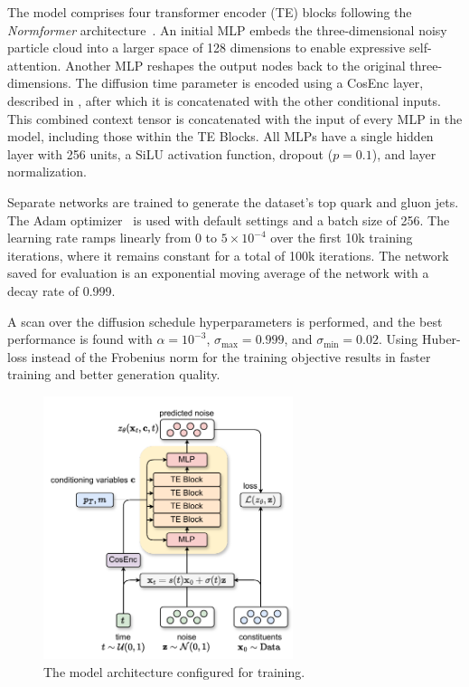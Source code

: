 The model comprises four transformer encoder (TE) blocks following the \textit{Normformer} architecture~\cite{Normformer}.
An initial MLP embeds the three-dimensional noisy particle cloud into a larger space of 128 dimensions to enable expressive self-attention.
Another MLP reshapes the output nodes back to the original three-dimensions.
The diffusion time parameter is encoded using a CosEnc layer, described in , after which it is concatenated with the other conditional inputs.
This combined context tensor is concatenated with the input of every MLP in the model, including those within the TE Blocks.
All MLPs have a single hidden layer with 256 units, a SiLU activation function, dropout ($p=0.1$), and layer normalization.

Separate networks are trained to generate the dataset's top quark and gluon jets.
The Adam optimizer~\cite{Adam} is used with default settings and a batch size of 256.
The learning rate ramps linearly from 0 to $5 \times 10^{-4}$ over the first 10k training iterations, where it remains constant for a total of 100k iterations.
The network saved for evaluation is an exponential moving average of the network with a decay rate of 0.999.

A scan over the diffusion schedule hyperparameters is performed, and the best performance is found with $\alpha=10^{-3}$, $\sigma_\text{max}=0.999$, and $\sigma_\text{min}=0.02$.
Using Huber-loss\cite{SmoothL1} instead of the Frobenius norm for the training objective results in faster training and better generation quality.

\begin{figure}
    \centering
    \includegraphics[width=0.65\textwidth]{Figures/jet_generation/pcjedi.pdf}
    \caption{The \pcjedi model architecture configured for training.}
    \label{fig:pcjedi}
\end{figure}

